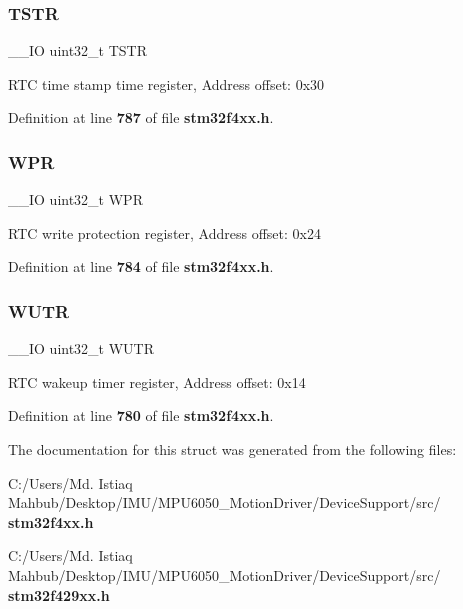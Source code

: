 \mbox{\label{structRTC__TypeDef_a042059c8b4168681d6aecf30211dd7b8}} 
\subsubsection{T\+S\+TR}
{\footnotesize\ttfamily \+\_\+\+\_\+\+IO uint32\+\_\+t T\+S\+TR}

R\+TC time stamp time register, Address offset\+: 0x30 

Definition at line \textbf{ 787} of file \textbf{ stm32f4xx.\+h}.

\mbox{\label{structRTC__TypeDef_a6204786b050eb135fabb15784698e86e}} 
\subsubsection{W\+PR}
{\footnotesize\ttfamily \+\_\+\+\_\+\+IO uint32\+\_\+t W\+PR}

R\+TC write protection register, Address offset\+: 0x24 

Definition at line \textbf{ 784} of file \textbf{ stm32f4xx.\+h}.

\mbox{\label{structRTC__TypeDef_ac5b3c8be61045a304d3076d4714d29f2}} 
\subsubsection{W\+U\+TR}
{\footnotesize\ttfamily \+\_\+\+\_\+\+IO uint32\+\_\+t W\+U\+TR}

R\+TC wakeup timer register, Address offset\+: 0x14 

Definition at line \textbf{ 780} of file \textbf{ stm32f4xx.\+h}.



The documentation for this struct was generated from the following files\+:\begin{DoxyCompactItemize}
\item 
C\+:/\+Users/\+Md. Istiaq Mahbub/\+Desktop/\+I\+M\+U/\+M\+P\+U6050\+\_\+\+Motion\+Driver/\+Device\+Support/src/\textbf{ stm32f4xx.\+h}\item 
C\+:/\+Users/\+Md. Istiaq Mahbub/\+Desktop/\+I\+M\+U/\+M\+P\+U6050\+\_\+\+Motion\+Driver/\+Device\+Support/src/\textbf{ stm32f429xx.\+h}\end{DoxyCompactItemize}
